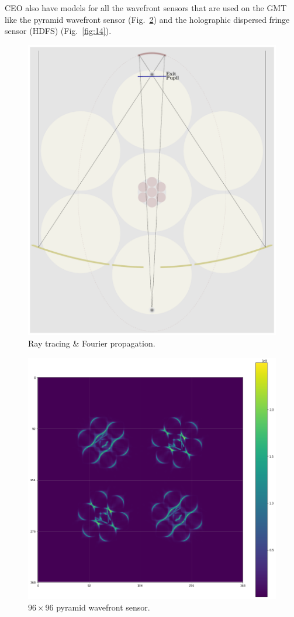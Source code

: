 \documentclass[]{AO4ELT}  %
\begin{document}
CEO also have models for all the wavefront sensors that are used on the GMT like the pyramid wavefront sensor (Fig.~\ref{fig:13}) and the holographic dispersed fringe sensor (HDFS) (Fig.~\ref{fig:14}).


\begin{figure}
   \centering
   \includegraphics[width=0.6\linewidth]{ray_tracing.pdf}
   \caption{Ray tracing \& Fourier propagation.}
   \label{fig:12}
\end{figure}

\begin{figure}
   \centering
   \includegraphics[trim=1cm 2cm 5cm 2cm,clip,width=0.6\linewidth]{pyramid.png}
   \caption{$96\times 96$ pyramid wavefront sensor.}
   \label{fig:13}
\end{figure}
\end{document}
